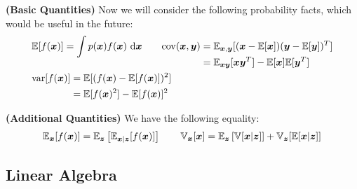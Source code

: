 \begin{remark}{\textbf{(Basic Quantities)}}
    Now we will consider the following probability facts, which would be useful in the future:
    \begin{equation*}
    \begin{aligned}
        &\mathbb{E}[f(\boldsymbol x)] = \int p(\boldsymbol x)f(\boldsymbol x)\ \mathrm{d} \boldsymbol x 
        \qquad \begin{aligned}[t]
            \operatorname{cov}(\boldsymbol x, \boldsymbol y) &= \mathbb{E}_{\boldsymbol x, \boldsymbol y}[(\boldsymbol x - \mathbb{E}[\boldsymbol x])(\boldsymbol y - \mathbb{E}[\boldsymbol y])^T] \\
            &= \mathbb{E}_{\boldsymbol x\boldsymbol y}[\boldsymbol x\boldsymbol y^T] - \mathbb{E}[\boldsymbol x]\mathbb{E}[\boldsymbol y^T]    
        \end{aligned} \\
        &\begin{aligned}[t] 
            \operatorname{var}[f(\boldsymbol x)] &= \mathbb{E}[(f(\boldsymbol x) - \mathbb{E}[f(\boldsymbol x)])^2] \\
            &= \mathbb{E}[f(\boldsymbol x)^2] - \mathbb{E}[f(\boldsymbol x)]^2 \\
        \end{aligned} 
    \end{aligned}
    \end{equation*}
\end{remark}

\begin{remark}{\textbf{(Additional Quantities)}}
    We have the following equality:
    \begin{equation*}
        \mathbb{E}_{\boldsymbol x}[f(\boldsymbol x)] = \mathbb{E}_{\boldsymbol z}\left[ \mathbb{E}_{\boldsymbol x|\boldsymbol z}[f(\boldsymbol x)] \right] \qquad \mathbb{V}_{\boldsymbol x}[\boldsymbol x] = \mathbb{E}_{\boldsymbol z}\left[ \mathbb{V}[\boldsymbol x|\boldsymbol z] \right] + \mathbb{V}_{\boldsymbol z}[\mathbb{E}[\boldsymbol x|\boldsymbol z]]
    \end{equation*}
\end{remark}

\subsection{Linear Algebra}


